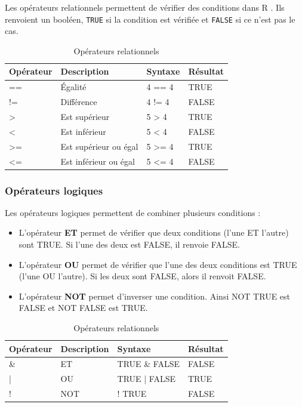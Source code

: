 \documentclass[
  11pt,
  french,
]{book}
\begin{document}
Les opérateurs relationnels permettent de vérifier des conditions dans R . Ils renvoient un booléen, \texttt{TRUE} si la condition est vérifiée et \texttt{FALSE} si ce n'est pas le cas.

\begin{table}

\caption{\label{tab:tableOperateurRela}Opérateurs relationnels}
\centering
\fontsize{8}{10}\selectfont
\begin{tabular}[t]{llll}
\toprule
Opérateur & Description & Syntaxe & Résultat\\
\midrule
== & Égalité & 4 == 4 & TRUE\\
!= & Différence & 4 != 4 & FALSE\\
> & Est supérieur & 5 > 4 & TRUE\\
< & Est inférieur & 5 < 4 & FALSE\\
>= & Est supérieur ou égal & 5 >= 4 & TRUE\\
\addlinespace
<= & Est inférieur ou égal & 5 <= 4 & FALSE\\
\bottomrule
\end{tabular}
\end{table}

\hypertarget{sect01353}{%
\subsubsection{Opérateurs logiques}\label{sect01353}}

Les opérateurs logiques permettent de combiner plusieurs conditions :

\begin{itemize}
\item
  L'opérateur \textbf{ET} permet de vérifier que deux conditions (l'une ET l'autre) sont TRUE. Si l'une des deux est FALSE, il renvoie FALSE.
\item
  L'opérateur \textbf{OU} permet de vérifier que l'une des deux conditions est TRUE (l'une OU l'autre). Si les deux sont FALSE, alors il renvoit FALSE.
\item
  L'opérateur \textbf{NOT} permet d'inverser une condition. Ainsi NOT TRUE est FALSE et NOT FALSE est TRUE.
\end{itemize}

\begin{table}

\caption{\label{tab:tableOperateurLogi}Opérateurs relationnels}
\centering
\fontsize{8}{10}\selectfont
\begin{tabular}[t]{llll}
\toprule
Opérateur & Description & Syntaxe & Résultat\\
\midrule
\& & ET & TRUE \& FALSE & FALSE\\
| & OU & TRUE | FALSE & TRUE\\
! & NOT & ! TRUE & FALSE\\
\bottomrule
\end{tabular}
\end{table}
\end{document}
